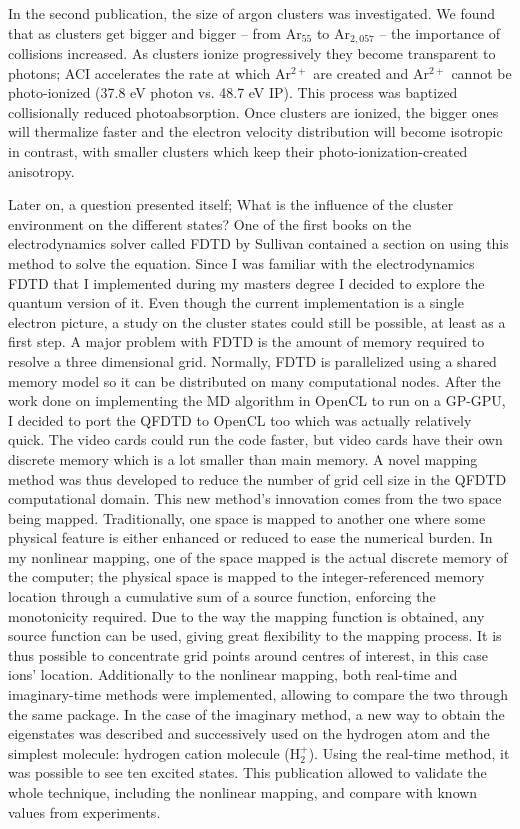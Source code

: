 In the second publication, the size of argon clusters was investigated. We found
that as clusters get bigger and bigger -- from Ar$_{55}$ to Ar$_{2,057}$ --
the importance of collisions increased. As clusters ionize progressively they
become transparent to photons; ACI accelerates the rate at which Ar$^{2+}$ are
created and Ar$^{2+}$ cannot be photo-ionized (37.8 eV photon vs. 48.7 eV IP).
This process was baptized collisionally reduced photoabsorption. Once clusters
are ionized, the bigger ones will thermalize faster and the electron velocity
distribution will become isotropic in contrast, with smaller clusters which
keep their photo-ionization-created anisotropy.


Later on, a question presented itself; What is the influence of the cluster
environment on the different states? One of the first books on the
electrodynamics solver called FDTD by Sullivan contained a section on using
this method to solve the \schrodinger equation. Since I was familiar with
the electrodynamics FDTD that I implemented during my masters degree I decided
to explore the quantum version of it. Even though the current implementation is
a single electron picture, a study on the cluster states could still be possible,
at least as a first step. A major problem with FDTD is the amount of memory
required to resolve a three dimensional grid. Normally, FDTD is parallelized
using a shared memory model so it can be distributed on many
computational nodes. After the work done on implementing the MD algorithm in
OpenCL to run on a GP-GPU, I decided to port the QFDTD to OpenCL too
which was actually relatively quick. The video cards could run the code faster,
but video cards have their own discrete memory which is a lot smaller than main
memory. A novel mapping method was thus developed to reduce the number of grid
cell size in the QFDTD computational domain. This new method's innovation comes
from the two space being mapped. Traditionally, one space is mapped to another
one where some physical feature is either enhanced or reduced to ease the numerical
burden. In my nonlinear mapping, one of the space mapped is the actual
discrete memory of the computer; the physical space is mapped to the
integer-referenced memory location through a cumulative sum of a source function,
enforcing the monotonicity required. Due to the way the mapping function is
obtained, any source function can be used, giving great flexibility to the
mapping process. It is thus possible to concentrate grid points around centres
of interest, in this case ions' location. Additionally to the nonlinear mapping,
both real-time and imaginary-time methods were implemented, allowing to compare
the two through the same package. In the case of the imaginary method, a new
way to obtain the eigenstates was described and successively used on the
hydrogen atom and the simplest molecule: hydrogen cation molecule (H$_{2}^{+}$).
Using the real-time method, it was possible to see ten excited states. This
publication allowed to validate the whole technique, including the nonlinear
mapping, and compare with known values from experiments.

